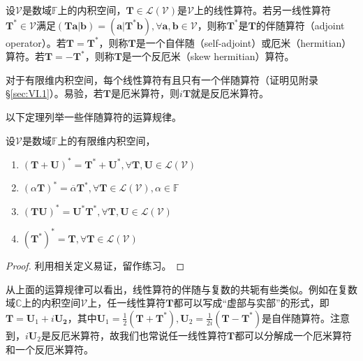 \documentclass[main.tex]{subfiles}
\begin{document}
\begin{definition}[伴随算符]\label{def:II.6.1}
    设$\mathcal{V}$是数域$\mathbb{F}$上的内积空间，$\mathbf{T}\in\mathcal{L}\left(\mathcal{V}\right)$是$\mathcal{V}$上的线性算符。若另一线性算符$\mathbf{T}^*\in\mathcal{V}$满足$\left(\mathbf{Ta}|\mathbf{b}\right)=\left(\mathbf{a}|\mathbf{T}^*\mathbf{b}\right),\forall\mathbf{a},\mathbf{b}\in\mathcal{V}$，则称$\mathbf{T}^*$是$\mathbf{T}$的伴随算符（adjoint operator）。若$\mathbf{T}=\mathbf{T}^*$，则称$\mathbf{T}$是一个自伴随（self-adjoint）或厄米（hermitian）算符。若$\mathbf{T}=-\mathbf{T}^*$，则称$\mathbf{T}$是一个反厄米（skew hermitian）算符。
\end{definition}

对于有限维内积空间，每个线性算符有且只有一个伴随算符（证明见附录\S\ref{sec:VI.1}）。易验，若$\mathbf{T}$是厄米算符，则$i\mathbf{T}$就是反厄米算符。

以下定理列举一些伴随算符的运算规律。

\begin{theorem}\label{thm:II.6.1}
    设$\mathcal{V}$是数域$\mathbb{F}$上的有限维内积空间，
    \begin{enumerate}
        \item $\left(\mathbf{T}+\mathbf{U}\right)^*=\mathbf{T}^*+\mathbf{U}^*,\forall\mathbf{T},\mathbf{U}\in\mathcal{L}\left(\mathcal{V}\right)$
        \item $\left(\alpha\mathbf{T}\right)^*=\overline{\alpha}\mathbf{T}^*,\forall\mathbf{T}\in\mathcal{L}\left(\mathcal{V}\right),\alpha\in\mathbb{F}$
        \item $\left(\mathbf{TU}\right)^*=\mathbf{U}^*\mathbf{T}^*,\forall\mathbf{T},\mathbf{U}\in\mathcal{L}\left(\mathcal{V}\right)$
        \item $\left(\mathbf{T}^*\right)^*=\mathbf{T},\forall\mathbf{T}\in\mathcal{L}\left(\mathcal{V}\right)$
    \end{enumerate}
\end{theorem}
\begin{proof}
    利用相关定义易证，留作练习。
\end{proof}

从上面的运算规律可以看出，线性算符的伴随与复数的共轭有些类似。例如在复数域$\mathbb{C}$上的内积空间$\mathcal{V}$上，任一线性算符$\mathbf{T}$都可以写成“虚部与实部”的形式，即$\mathbf{T}=\mathbf{U}_1+i\mathbf{U_2}$，其中$\mathbf{U}_1=\frac{1}{2}\left(\mathbf{T}+\mathbf{T}^*\right),\mathbf{U}_2=\frac{1}{2i}\left(\mathbf{T}-\mathbf{T}^*\right)$是自伴随算符。注意到，$i\mathbf{U}_2$是反厄米算符，故我们也常说任一线性算符$\mathbf{T}$都可以分解成一个厄米算符和一个反厄米算符。
\end{document}

